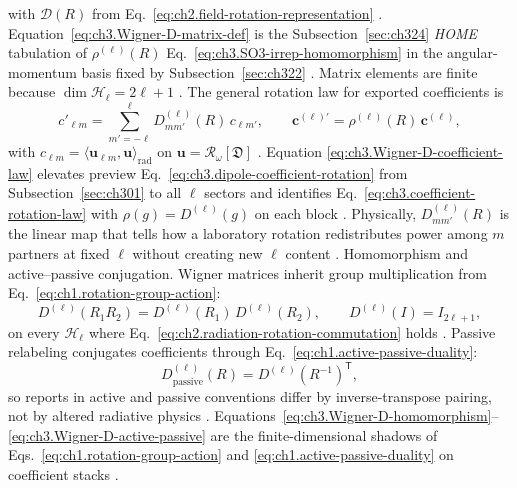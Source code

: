 with \(\mathcal{D}(R)\) from Eq.~\eqref{eq:ch2.field-rotation-representation} \cite{jackson1999}.
Equation~\eqref{eq:ch3.Wigner-D-matrix-def} is the Subsection~\ref{sec:ch324} \emph{HOME} tabulation of
\(\rho^{(\ell)}(R)\) Eq.~\eqref{eq:ch3.SO3-irrep-homomorphism} in the angular-momentum basis fixed by
Subsection~\ref{sec:ch322} \cite{jackson1999}. Matrix elements are finite because \(\dim\mathcal{H}_{\ell}=2\ell+1\)
\cite{hansen1988}.
The general rotation law for exported coefficients is
\begin{equation}
\label{eq:ch3.Wigner-D-coefficient-law}
c'_{\ell m}
=
\sum_{m'=-\ell}^{\ell}
D^{(\ell)}_{m m'}(R)\,c_{\ell m'},
\qquad
\mathbf{c}^{(\ell)\prime}=\rho^{(\ell)}(R)\,\mathbf{c}^{(\ell)},
\end{equation}
with \(c_{\ell m}=\langle \mathbf{u}_{\ell m},\mathbf{u}\rangle_{\mathrm{rad}}\) on
\(\mathbf{u}=\mathcal{R}_\omega[\mathfrak{D}]\) \cite{jackson1999}. Equation
\eqref{eq:ch3.Wigner-D-coefficient-law} elevates preview Eq.~\eqref{eq:ch3.dipole-coefficient-rotation} from
Subsection~\ref{sec:ch301} to all \(\ell\) sectors and identifies
Eq.~\eqref{eq:ch3.coefficient-rotation-law} with \(\rho(g)=D^{(\ell)}(g)\) on each block
\cite{hansen1988}. Physically, \(D^{(\ell)}_{m m'}(R)\) is the linear map that tells how a
laboratory rotation redistributes power among \(m\) partners at fixed \(\ell\) without creating new \(\ell\)
content \cite{stratton1941}.
Homomorphism and active--passive conjugation. Wigner matrices inherit group multiplication from Eq.~\eqref{eq:ch1.rotation-group-action}:
\begin{equation}
\label{eq:ch3.Wigner-D-homomorphism}
D^{(\ell)}(R_1R_2)
=
D^{(\ell)}(R_1)\,D^{(\ell)}(R_2),
\qquad
D^{(\ell)}(I)=I_{2\ell+1},
\end{equation}
on every \(\mathcal{H}_{\ell}\) where Eq.~\eqref{eq:ch2.radiation-rotation-commutation} holds
\cite{jackson1999}. Passive relabeling conjugates coefficients through
Eq.~\eqref{eq:ch1.active-passive-duality}:
\begin{equation}
\label{eq:ch3.Wigner-D-active-passive}
D^{(\ell)}_{\mathrm{passive}}(R)
=
D^{(\ell)}(R^{-1})^{\mathsf{T}},
\end{equation}
so reports in active and passive conventions differ by inverse-transpose pairing, not by altered radiative
physics \cite{stratton1941}. Equations~\eqref{eq:ch3.Wigner-D-homomorphism}--\eqref{eq:ch3.Wigner-D-active-passive}
are the finite-dimensional shadows of Eqs.~\eqref{eq:ch1.rotation-group-action} and
\eqref{eq:ch1.active-passive-duality} on coefficient stacks \cite{stratton1941}.
